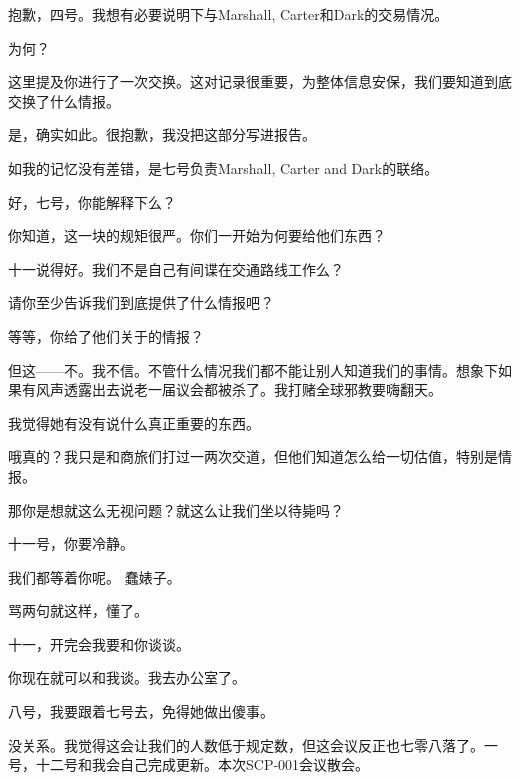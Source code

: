 \begin{scpbox}

抱歉，四号。我想有必要说明下与Marshall, Carter和Dark的交易情况。

为何？

这里提及你进行了一次交换。这对记录很重要，为整体信息安保，我们要知道到底交换了什么情报。

是，确实如此。很抱歉，我没把这部分写进报告。

如我的记忆没有差错，是七号负责Marshall, Carter and Dark的联络。

好，七号，你能解释下么？


你知道，这一块的规矩很严。你们一开始为何要给他们东西？

十一说得好。我们不是自己有间谍在交通路线工作么？


请你至少告诉我们到底提供了什么情报吧？


等等，你给了他们关于的情报？


但这——不。我不信。不管什么情况我们都不能让别人知道我们的事情。想象下如果有风声透露出去说老一届议会都被杀了。我打赌全球邪教要嗨翻天。

我觉得她有没有说什么真正重要的东西。

哦真的？我只是和商旅们打过一两次交道，但他们知道怎么给一切估值，特别是情报。


那你是想就这么无视问题？就这么让我们坐以待毙吗？

十一号，你要冷静。

我们都等着你呢。 \ii{{[}低声]}蠢婊子。


骂两句就这样，懂了。

十一，开完会我要和你谈谈。

你现在就可以和我谈。我去办公室了。


八号，我要跟着七号去，免得她做出傻事。

没关系。我觉得这会让我们的人数低于规定数，但这会议反正也七零八落了。一号，十二号和我会自己完成更新。本次SCP-001会议散会。

\end{scpbox}

